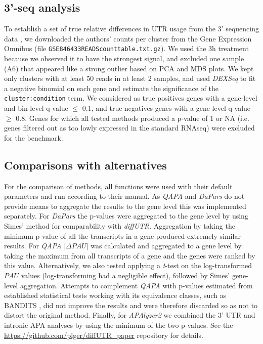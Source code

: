 \documentclass{bmcart}
\begin{document}
\subsection{3'-seq analysis}

To establish a set of true relative differences in UTR usage from the 3' sequencing data \cite{Fontes2017Activity-DependentPotentiation}, we downloaded the authors' counts per cluster from the Gene Expression Omnibus (file \texttt{GSE84643\textunderscore 3READS\textunderscore count\textunderscore table.txt.gz}). We used the 3h treatment because we observed it to have the strongest signal, and excluded one sample (A6) that appeared like a strong outlier based on PCA and MDS plots. We kept only clusters with at least 50 reads in at least 2 samples, and used \textit{DEXSeq} to fit a negative binomial on each gene and estimate the significance of the \texttt{cluster:condition} term. We considered as true positives genes with a gene-level and bin-level q-value $\leq$ 0.1, and true negatives genes with a gene-level q-value $\geq$ 0.8. Genes for which all tested methods produced a p-value of 1 or NA (i.e. genes filtered out as too lowly expressed in the standard RNAseq) were excluded for the benchmark.

\subsection{Comparisons with alternatives}

For the comparison of methods, all functions were used with their default parameters and  run according to their manual. As \textit{QAPA} and \textit{DaPars} do not provide means to aggregate the results to the gene level this was implemented separately. For \textit{DaPars} the p-values were aggregated to the gene level by using Simes' method \cite{Simes1986AnSignificance} for comparability with \textit{diffUTR}. Aggregation by taking the minimum p-value of all the transcripts in a gene produced extremely similar results. For \textit{QAPA} $|\Delta PAU|$ was calculated and aggregated to a gene level by taking the maximum from all transcripts of a gene and the genes were ranked by this value. Alternatively, we also tested applying a \textit{t}-test on the log-transformed $PAU$ values (log-transforming had a negligible effect), followed by Simes' gene-level aggregation. Attempts to complement \textit{QAPA} with p-values estimated from established statistical tests working with its equivalence classes, such as BANDITS \cite{Tiberi2020BANDITS:Uncertainty}, did not improve the results and were therefore discarded so as not to distort the original method. Finally, for \textit{APAlyzer2} we combined the 3' UTR and intronic APA analyses by using the minimum of the two p-values. See the \url{https://github.com/plger/diffUTR_paper} repository for details.
\end{document}
